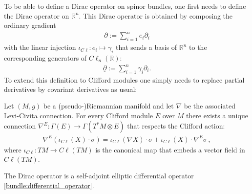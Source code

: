     To be able to define a Dirac operator on spinor bundles, one first needs to define the Dirac operator on $\mathbb{R}^n$. This Dirac operator is obtained by composing the ordinary gradient
    \begin{gather}
        \partial:=\sum_{i=1}^ne_i\partial_i
    \end{gather}
    with the linear injection $\iota_{C\ell}:e_i\mapsto\gamma_i$ that sends a basis of $\mathbb{R}^n$ to the corresponding generators of $C\ell_n(\mathbb{R})$:
    \begin{gather}
        \label{riemann:dirac_operator_R}
        \underline{\partial} := \sum_{i=1}^n\gamma_i\partial_i.
    \end{gather}
    To extend this definition to Clifford modules one simply needs to replace partial derivatives by covariant derivatives as usual:
    \begin{property}
        Let $(M,g)$ be a (pseudo-)Riemannian manifold and let $\nabla$ be the associated Levi-Civita connection. For every Clifford module $E$ over $M$ there exists a unique connection $\nabla^E:\Gamma(E)\rightarrow\Gamma(T^*M\otimes E)$ that respects the Clifford action:
        \begin{gather}
            \nabla^E(\iota_{C\ell}(X)\cdot\sigma) = \iota_{C\ell}(\nabla X)\cdot\sigma + \iota_{C\ell}(X)\cdot\nabla^E\sigma\,,
        \end{gather}
        where $\iota_{C\ell}:TM\rightarrow C\ell(TM)$ is the canonical map that embeds a vector field in $C\ell(TM)$.
    \end{property}

    \begin{property}[Ellipticity]
        The Dirac operator is a self-adjoint elliptic differential operator \ref{bundle:differential_operator}.
    \end{property}

